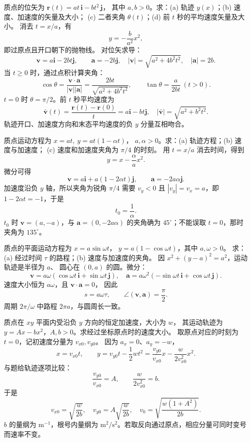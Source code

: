 质点的位矢为 $\bm r(t)=at\,\bm i-bt^2\,\bm j$，
其中 $a,b>0$。求：(a) 轨迹 $y(x)$；(b) 速度、加速度的矢量及大小；
(c) 二者夹角 $\theta(t)$；(d) 前 $t$ 秒的平均速度矢量及大小。
\exsolution
消去 $t=x/a$，有
\[
 \boxed{y=-\frac b{a^2}x^2},
\]
即过原点且开口朝下的抛物线。
对位矢求导：
\[
 \boxed{\bm v=a\bm i-2bt\bm j,\qquad
 \bm a=-2b\bm j},\quad
 |\bm v|=\sqrt{a^2+4b^2t^2},\quad|\bm a|=2b.
\]
当 $t\ge0$ 时，通过点积计算夹角：
\[
 \cos\theta=\frac{\bm v\cdot\bm a}{|\bm v||\bm a|}
 =\frac{2bt}{\sqrt{a^2+4b^2t^2}},\qquad
 \boxed{\tan\theta=\frac a{2bt}\ (t>0)}.
\]
$t=0$ 时 $\theta=\pi/2$。前 $t$ 秒平均速度为
\[
 \boxed{\bar{\bm v}(t)=\frac{\bm r(t)-\bm r(0)}t
 =a\bm i-bt\bm j,\quad
 |\bar{\bm v}|=\sqrt{a^2+b^2t^2}.}
\]
\excheck 轨迹开口、加速度方向和末态平均速度的负 $y$ 分量互相吻合。

质点运动方程为 $x=at,\ y=at(1-\alpha t)$，
$a,\alpha>0$。求：(a) 轨迹方程；(b) 速度与加速度；
(c) 速度和加速度夹角为 $\pi/4$ 的时刻。
\exsolution
用 $t=x/a$ 消去时间，得到
\[
 \boxed{y=x-\frac{\alpha}{a}x^2}.
\]
微分可得
\[
 \boxed{\bm v=a\bm i+a(1-2\alpha t)\bm j,\qquad
 \bm a=-2a\alpha\bm j}.
\]
加速度沿负 $y$ 轴，所以夹角为锐角 $\pi/4$ 需要
$v_y<0$ 且 $|v_y|=v_x=a$，即 $1-2\alpha t=-1$，于是
\[
 \boxed{t_0=\frac1\alpha}.
\]
\excheck $t_0$ 时 $\bm v=(a,-a)$，与 $\bm a=(0,-2a\alpha)$
的夹角确为 $45^\circ$；不能误取 $t=0$，那时夹角为 $135^\circ$。

质点的平面运动方程为 $x=a\sin\omega t$，
$y=a(1-\cos\omega t)$，其中 $a,\omega>0$。
求：(a) 经过时间 $\tau$ 的路程；(b) 速度与加速度的夹角。
\exsolution
因 $x^2+(y-a)^2=a^2$，运动轨迹是半径为 $a$、
圆心在 $(0,a)$ 的圆。微分：
\[
 \bm v=a\omega(\cos\omega t\,\bm i+\sin\omega t\,\bm j),\quad
 \bm a=a\omega^2(-\sin\omega t\,\bm i+\cos\omega t\,\bm j).
\]
速度大小恒为 $a\omega$，且 $\bm v\cdot\bm a=0$，
因此
\[
 \boxed{s=a\omega\tau,\qquad \angle(\bm v,\bm a)=\frac\pi2.}
\]
\excheck 周期 $2\pi/\omega$ 中路程 $2\pi a$，与圆周长一致。

质点在 $xy$ 平面内受沿负 $y$ 方向的恒定加速度，大小为 $w$，
其运动轨迹为 $y=Ax-bx^2$，$A,b>0$。求经过坐标原点时的速度大小。
\exsolution
取原点对应的时刻为 $t=0$，记初速度分量为 $v_{x0},v_{y0}$。
因为 $a_x=0$、$a_y=-w$，
\[
 x=v_{x0}t,\qquad y=v_{y0}t-\frac12wt^2
 =\frac{v_{y0}}{v_{x0}}x-\frac{w}{2v_{x0}^2}x^2.
\]
与题给轨迹逐项比较：
\[
 \frac{v_{y0}}{v_{x0}}=A,\qquad
 \frac{w}{2v_{x0}^2}=b.
\]
于是
\[
 \boxed{v_{x0}=\sqrt{\frac w{2b}},\quad
 v_{y0}=A\sqrt{\frac w{2b}},\quad
 v_0=\sqrt{\frac{w(1+A^2)}{2b}}.}
\]
\excheck $b$ 的量纲为 $\mathrm m^{-1}$，根号内量纲为
$\mathrm m^2/\mathrm s^2$。若取反向通过原点，相应分量可同时变号而速率不变。

